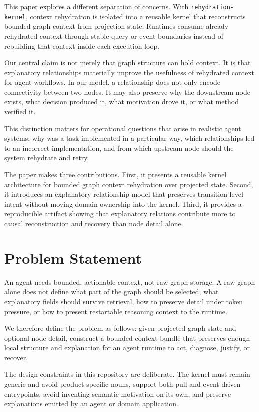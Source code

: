 \documentclass[11pt]{article}
\begin{document}
This paper explores a different separation of concerns. With
\texttt{rehydration-kernel}, context rehydration is isolated into a reusable
kernel that reconstructs bounded graph context from projection state. Runtimes
consume already rehydrated context through stable query or event boundaries
instead of rebuilding that context inside each execution loop.

Our central claim is not merely that graph structure can hold context. It is
that explanatory relationships materially improve the usefulness of rehydrated
context for agent workflows. In our model, a relationship does not only encode
connectivity between two nodes. It may also preserve why the downstream node
exists, what decision produced it, what motivation drove it, or what method
verified it.

This distinction matters for operational questions that arise in realistic
agent systems: why was a task implemented in a particular way, which
relationships led to an incorrect implementation, and from which upstream node
should the system rehydrate and retry.

The paper makes three contributions. First, it presents a reusable kernel
architecture for bounded graph context rehydration over projected state.
Second, it introduces an explanatory relationship model that preserves
transition-level intent without moving domain ownership into the kernel.
Third, it provides a reproducible artifact showing that explanatory relations
contribute more to causal reconstruction and recovery than node detail alone.

\section{Problem Statement}

An agent needs bounded, actionable context, not raw graph storage. A raw graph
alone does not define what part of the graph should be selected, what
explanatory fields should survive retrieval, how to preserve detail under
token pressure, or how to present restartable reasoning context to the
runtime.

We therefore define the problem as follows: given projected graph state and
optional node detail, construct a bounded context bundle that preserves enough
local structure and explanation for an agent runtime to act, diagnose,
justify, or recover.

The design constraints in this repository are deliberate. The kernel must
remain generic and avoid product-specific nouns, support both pull and
event-driven entrypoints, avoid inventing semantic motivation on its own, and
preserve explanations emitted by an agent or domain application.
\end{document}
